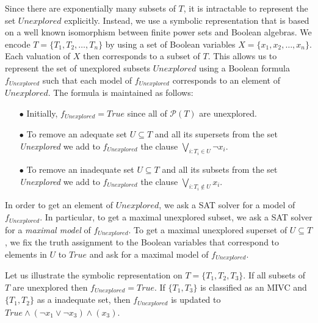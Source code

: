 Since there are exponentially many subsets of $T$, it is intractable to represent the set $\mathit{Unexplored}$ explicitly. Instead, we use a symbolic representation that is based on a well known isomorphism between finite power sets and Boolean algebras. We encode $T = \{T_1, T_2, \ldots , T_n \}$ by using a set of Boolean variables $X = \{x_1, x_2, \ldots , x_n \}$. Each valuation of $X$ then corresponds to a subset of $T$. This allows us to represent the set of unexplored subsets $\mathit{Unexplored}$ using a Boolean formula $f_{\mathit{Unexplored}}$ such that each model of $f_{\mathit{Unexplored}}$ corresponds to an element of $\mathit{Unexplored}$.
The formula is maintained as follows:
\begin{itemize}
	\item[$\bullet$] Initially, $f_{\mathit{Unexplored}} = \mathit{True}$ since all of $\mathcal{P}(T)$ are unexplored.
	
	\smallskip
	\item[$\bullet$] To remove an adequate set $U \subseteq T$ and all its supersets from the set \textit{Unexplored} we add to $f_{\mathit{Unexplored}}$ the clause  $\bigvee_{i: T_i \in U} \neg x_i$.

	\smallskip
	\item[$\bullet$] To remove an inadequate set $U \subseteq T$ and all its subsets from the set \textit{Unexplored} we add to $f_{\mathit{Unexplored}}$ the clause  $\bigvee_{i: T_i \not\in U} x_i$.
\end{itemize}


In order to get an element of $\mathit{Unexplored}$, we ask a SAT solver for a model of $f_{\mathit{Unexplored}}$. In particular, to get a maximal unexplored subset, we ask a SAT solver for a \emph{maximal model} of $f_{\mathit{Unexplored}}$. To get a maximal unexplored superset of $U \subseteq T$, we fix the truth assignment to the Boolean variables that correspond to elements in $U$ to $\mathit{True}$ and ask for a maximal model of $f_{\mathit{Unexplored}}$.

\label{ex:unex}
Let us illustrate the symbolic representation on $T = \{ T_1, T_2, T_3 \}$. If  all subsets of $T$ are unexplored then $f_{\mathit{Unexplored}} = \mathit{True}$. If   $\{T_1, T_3 \}$ is classified as an MIVC and $\{T_1, T_2 \}$ as a inadequate set, then $f_{\mathit{Unexplored}}$ is updated to $\mathit{True} \wedge (\neg x_1 \vee \neg x_3) \wedge (x_3)$.


